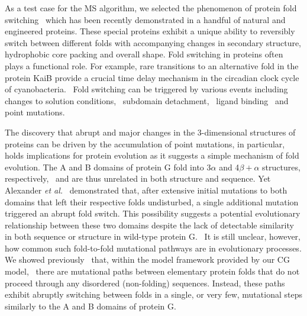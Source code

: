 \documentclass[
aip,
rsi,%
amsmath,amssymb,
reprint,%
]{revtex4-1}
\begin{document}
{\color{red} As a test case for the MS algorithm, we selected the phenomenon of protein fold switching~\cite{Bryan2010} which has been recently demonstrated in a handful of natural and engineered proteins. These special proteins exhibit a unique ability to reversibly switch between different folds with accompanying changes in secondary structure, hydrophobic core packing and overall shape. Fold switching in proteins often plays a functional role. For example, rare transitions to an alternative fold in the protein KaiB provide a crucial time delay mechanism in the circadian clock cycle of cyanobacteria.~\cite{LiWang2015} Fold switching can be triggered by various events including changes to solution conditions,~\cite{Kuloglu2002} subdomain detachment,~\cite{Burmann2012} ligand binding~\cite{Luo2004} and point mutations.~\cite{Alexander2009} }

{\color{red} The discovery that abrupt and major changes in the 3-dimensional structures of proteins can be driven by the accumulation of point mutations, in particular, holds implications for protein evolution as it suggests a simple mechanism of fold evolution. The A and B domains of protein G fold into 3$\alpha$ and 4$\beta+\alpha$ structures, respectively,~\cite{Alexander2009} and are thus unrelated in both structure and sequence. Yet Alexander \textit{et al.}~\cite{Alexander2009} demonstrated that, after extensive initial mutations to both domains that left their respective folds undisturbed, a single additional mutation triggered an abrupt fold switch. This possibility suggests a potential evolutionary relationship between these two domains despite the lack of detectable similarity in both sequence or structure in wild-type protein G.~\cite{He2012} It is still unclear, however, how common such fold-to-fold mutational pathways are in evolutionary processes. We showed previously~\cite{Holzgrafe2014,Holzgrafe2015} that, within the model framework provided by our CG model,~\cite{Bhattacherjee2012} there are mutational paths between elementary protein folds that do not proceed through any disordered (non-folding) sequences. Instead, these paths exhibit abruptly switching between folds in a single, or very few, mutational steps similarly to the A and B domains of protein G. }
\end{document}
